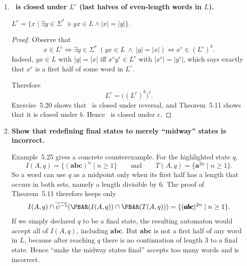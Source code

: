 \begin{enumerate}[{5.}1. ]
\begin{enumerate}[(a)]
  \item \textbf{Example where $\PBAR(\psi^{-1}(L))\neq L$:} Take $\psi(\pmb{a})=\pmb{a}\pmb{a}$, $L=\{\pmb{a}\}$ (singleton).  Then $\psi^{-1}(L)=\emptyset$ (no word maps to $\pmb{a}$ under $\psi$, since $\psi$ always produces even-length strings), and $\PBAR(\emptyset)=\emptyset\neq L$.

  \item \textbf{Example where $\psi^{-1}(\PBAR(L))\neq L$:} Same: $\psi^{-1}(\PBAR(\{\pmb{a}\}))=\psi^{-1}(\{\pmb{a}\})=\emptyset\neq\{\pmb{a}\}=L$.

  \item \textbf{Prove $\PBAR(\psi^{-1}(L))\subseteq L$:} Let $y\in\PBAR(\psi^{-1}(L))$.  Then $y=\psi(x)$ for some $x\in\psi^{-1}(L)$.  Since $x\in\psi^{-1}(L)$, $\psi(x)\in L$, i.e., $y\in L$. \qed

  \item \textbf{Prove $L\subseteq\psi^{-1}(\PBAR(L))$:} Let $x\in L$.  Then $\psi(x)\in\PBAR(L)$ (since $\psi(x)$ is the image of some element of $L$, namely $x$ itself).  Hence $x\in\psi^{-1}(\PBAR(L))$. \qed
\end{enumerate}

\item \textbf{\DSIG\ is closed under $L^e$ (last halves of even-length words in $L$).}

$L^e=\{x\mid\exists y\in\Sigma^*\ni yx\in L\wedge|x|=|y|\}$.

\begin{proof}
Observe that
\[
x\in L^e
\iff \exists y\in\Sigma^*\ (yx\in L\ \wedge\ |y|=|x|)
\iff x^r\in (L^r)^b.
\]
Indeed, $yx\in L$ with $|y|=|x|$ iff $x^ry^r\in L^r$ with
$|x^r|=|y^r|$, which says exactly that $x^r$ is a first half of some word in
$L^r$.

Therefore
\[
L^e=\bigl((L^r)^b\bigr)^r.
\]
Exercise~5.20 shows that \DSIG\ is closed under reversal, and
Theorem~5.11 shows that it is closed under $b$.  Hence \DSIG\ is closed under
$e$.
\end{proof}

\item \textbf{Show that redefining final states to merely ``midway'' states is incorrect.}

Example~5.25 gives a concrete counterexample.  For the highlighted state $q$,
\[
I(A,q)=\{(\pmb{abc})^n\mid n\ge 1\}
\qquad\text{and}\qquad
T(A,q)=\{\pmb{a}^{2n}\mid n\ge 1\}.
\]
So a word can use $q$ as a midpoint only when its first half has a length that
occurs in both sets, namely a length divisible by $6$.  The proof of
Theorem~5.11 therefore keeps only
\[
I(A,q)\cap\overline{\psi^{-1}}(\PBAR(I(A,q))\cap\PBAR(T(A,q)))
=\{(\pmb{abc})^{2n}\mid n\ge 1\}.
\]
If we simply declared $q$ to be a final state, the resulting automaton would
accept all of $I(A,q)$, including $\pmb{abc}$.  But $\pmb{abc}$ is not a first
half of any word in $L$, because after reaching $q$ there is no continuation of
length $3$ to a final state.  Hence ``make the midway states final'' accepts too
many words and is incorrect.


\end{enumerate}
